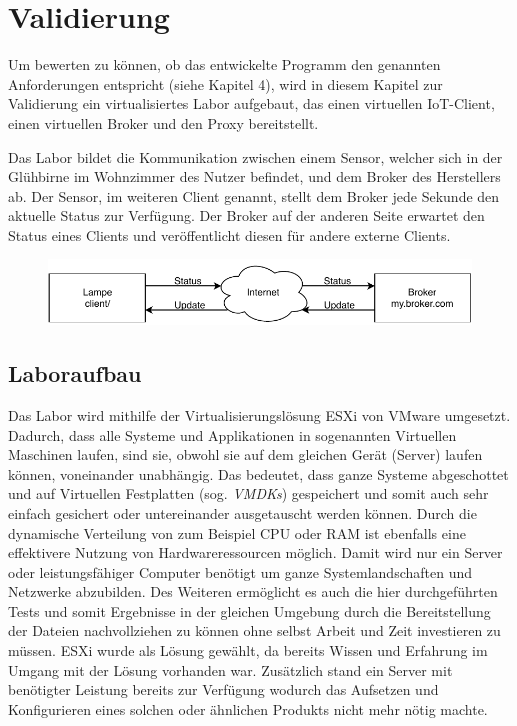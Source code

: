 \chapter{Validierung}
    
Um bewerten zu können, ob das entwickelte Programm den genannten Anforderungen entspricht (siehe Kapitel 4), wird in diesem Kapitel zur Validierung ein virtualisiertes Labor aufgebaut, das einen virtuellen \ac{IoT}-Client, einen virtuellen Broker und den Proxy bereitstellt.

Das Labor bildet die Kommunikation zwischen einem Sensor, welcher sich in der Glühbirne im Wohnzimmer des Nutzer befindet, und dem Broker des Herstellers ab. Der Sensor, im weiteren Client genannt, stellt dem Broker jede Sekunde den aktuelle Status zur Verfügung. Der Broker auf der anderen Seite erwartet den Status eines Clients und veröffentlicht diesen für andere externe Clients.

\begin{figure}[h]%
    \centering
    \includegraphics[width=14cm]{tex/bilder/6_validierung/Szenario.pdf}
    \label{fig:darstellung-szenario}
\end{figure}

\section{Laboraufbau}
    Das Labor wird mithilfe der Virtualisierungslösung ESXi %
    von VMware umgesetzt. Dadurch, dass alle Systeme und Applikationen in sogenannten Virtuellen Maschinen laufen, sind sie, obwohl sie auf dem gleichen Gerät (Server) laufen können, voneinander unabhängig. Das bedeutet, dass ganze Systeme abgeschottet und auf Virtuellen Festplatten (sog. \emph{\acp{VMDK}}) gespeichert und somit auch sehr einfach gesichert oder untereinander ausgetauscht werden können. Durch die dynamische Verteilung von zum Beispiel CPU oder RAM ist ebenfalls eine effektivere Nutzung von Hardwareressourcen möglich. Damit wird nur ein Server oder leistungsfähiger Computer benötigt um ganze Systemlandschaften und Netzwerke abzubilden. Des Weiteren ermöglicht es auch die hier durchgeführten Tests und somit Ergebnisse in der gleichen Umgebung durch die Bereitstellung der Dateien nachvollziehen zu können ohne selbst Arbeit und Zeit investieren zu müssen.
    ESXi wurde als Lösung gewählt, da bereits Wissen und Erfahrung im Umgang mit der Lösung vorhanden war. Zusätzlich stand ein Server mit benötigter Leistung bereits zur Verfügung wodurch das Aufsetzen und Konfigurieren eines solchen oder ähnlichen Produkts nicht mehr nötig machte.
    
